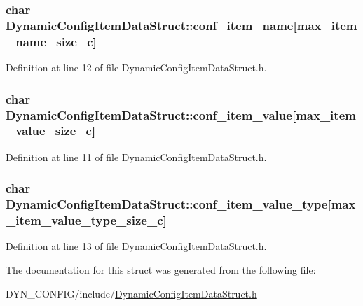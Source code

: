 \subsubsection[{\texorpdfstring{conf\+\_\+item\+\_\+name}{conf_item_name}}]{\setlength{\rightskip}{0pt plus 5cm}char Dynamic\+Config\+Item\+Data\+Struct\+::conf\+\_\+item\+\_\+name\mbox{[}{\bf max\+\_\+item\+\_\+name\+\_\+size\+\_\+c}\mbox{]}}\hypertarget{structDynamicConfigItemDataStruct_ab6daf678bb97c46fe6a18c7da629b448}{}\label{structDynamicConfigItemDataStruct_ab6daf678bb97c46fe6a18c7da629b448}


Definition at line 12 of file Dynamic\+Config\+Item\+Data\+Struct.\+h.

\subsubsection[{\texorpdfstring{conf\+\_\+item\+\_\+value}{conf_item_value}}]{\setlength{\rightskip}{0pt plus 5cm}char Dynamic\+Config\+Item\+Data\+Struct\+::conf\+\_\+item\+\_\+value\mbox{[}{\bf max\+\_\+item\+\_\+value\+\_\+size\+\_\+c}\mbox{]}}\hypertarget{structDynamicConfigItemDataStruct_a4959e12c0fab44e54a8edc4dde9e6386}{}\label{structDynamicConfigItemDataStruct_a4959e12c0fab44e54a8edc4dde9e6386}


Definition at line 11 of file Dynamic\+Config\+Item\+Data\+Struct.\+h.

\subsubsection[{\texorpdfstring{conf\+\_\+item\+\_\+value\+\_\+type}{conf_item_value_type}}]{\setlength{\rightskip}{0pt plus 5cm}char Dynamic\+Config\+Item\+Data\+Struct\+::conf\+\_\+item\+\_\+value\+\_\+type\mbox{[}{\bf max\+\_\+item\+\_\+value\+\_\+type\+\_\+size\+\_\+c}\mbox{]}}\hypertarget{structDynamicConfigItemDataStruct_ac63f92a24fff751ddcf49be5eae1fc0d}{}\label{structDynamicConfigItemDataStruct_ac63f92a24fff751ddcf49be5eae1fc0d}


Definition at line 13 of file Dynamic\+Config\+Item\+Data\+Struct.\+h.



The documentation for this struct was generated from the following file\+:\begin{DoxyCompactItemize}
\item 
D\+Y\+N\+\_\+\+C\+O\+N\+F\+I\+G/include/\hyperlink{DynamicConfigItemDataStruct_8h}{Dynamic\+Config\+Item\+Data\+Struct.\+h}\end{DoxyCompactItemize}
